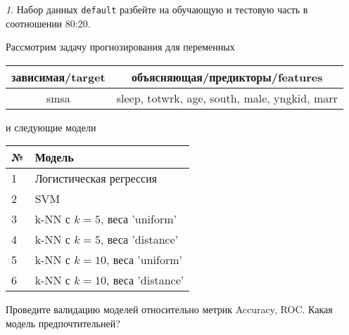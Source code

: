 \documentclass[12pt]{article}
\theoremstyle{remark}
\newtheorem{exercise}{}[section]
\begin{document}
\begin{exercise}
Набор данных \texttt{default} разбейте на обучающую и тестовую часть
в соотношении 80:20.
	
Рассмотрим задачу прогнозирования для переменных
\begin{center}
	\begin{tabular}{|c|c|}\hline
		зависимая/target & объясняющая/предикторы/features \\ \hline
		smsa & sleep, totwrk, age, south, male, yngkid, marr \\ \hline
	\end{tabular}
\end{center}
и следующие модели
\begin{center}
	\begin{tabular}{|l|l|}\hline
		№ & Модель \\ \hline
		1 & Логистическая регрессия\\
		2 & SVM \\ 
		3 & k-NN с \(k=5\), веса 'uniform' \\
		4 & k-NN с \(k=5\), веса 'distance' \\
		5 & k-NN с \(k=10\), веса 'uniform' \\
		6 & k-NN с \(k=10\), веса 'distance' \\ \hline
	\end{tabular}
\end{center}
Проведите валидацию моделей относительно метрик Accuracy, ROC. Какая модель предпочтительней?
\end{exercise}



\end{document}
